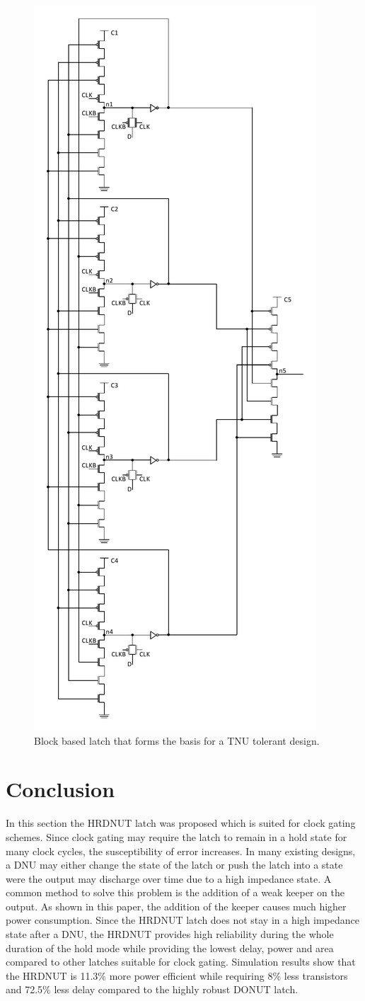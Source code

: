 \begin{figure}[!htbp]
	\centering
	\includegraphics[width=0.50\linewidth]{Figures/TNUBlatch}
	\caption{Block based latch that forms the basis for a TNU tolerant design.}
	\label{TNUB}
\end{figure}

 

\section{Conclusion} \label{sec:conc}
In this section the HRDNUT latch was proposed which is suited for clock gating schemes. Since clock gating may require the latch to remain in a hold state for many clock cycles, the susceptibility of error increases. In many existing designs, a DNU may either change the state of the latch or push the latch into a state were the output may discharge over time due to a high impedance state. A common method to solve this problem is the addition of a weak keeper on the output. As shown in this paper, the addition of the keeper causes much higher power consumption. Since the HRDNUT latch does not stay in a high impedance state after a DNU, the HRDNUT provides high reliability during the whole duration of the hold mode while providing the lowest delay, power and area compared to other latches suitable for clock gating. Simulation results show that the HRDNUT is 11.3\% more power efficient while requiring 8\% less transistors and 72.5\% less delay compared to the highly robust DONUT latch. 

